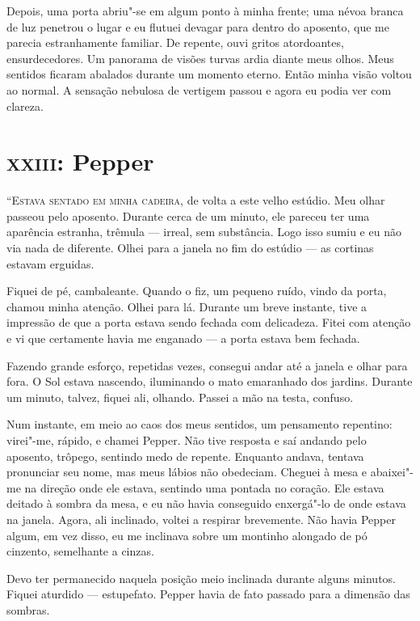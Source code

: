 Depois, uma porta abriu"-se em algum ponto à minha frente; uma névoa branca de luz penetrou o lugar e eu flutuei
devagar para dentro do aposento, que me parecia estranhamente familiar. De repente, ouvi gritos atordoantes,
ensurdecedores. Um panorama de visões turvas ardia diante meus olhos. Meus sentidos ficaram abalados durante um momento
eterno. Então minha visão voltou ao normal. A sensação nebulosa de vertigem passou e agora eu podia ver com clareza.


\clearpage

\chapter{\textsc{xxiii}:  Pepper}

\textsc{“Estava sentado em minha cadeira,} de volta a este velho estúdio. Meu olhar passeou pelo aposento. Durante cerca de um
minuto, ele pareceu ter uma aparência estranha, trêmula --- irreal, sem substância. Logo isso sumiu e eu não via nada de
diferente. Olhei para a janela no fim do estúdio --- as cortinas estavam erguidas.

Fiquei de pé, cambaleante. Quando o fiz, um pequeno ruído, vindo da porta, chamou minha atenção. Olhei para lá. Durante
um breve instante, tive a impressão de que a porta estava sendo fechada com delicadeza. Fitei com atenção e vi que
certamente havia me enganado --- a porta estava bem fechada.

Fazendo grande esforço, repetidas vezes, consegui andar até a janela e olhar para fora. O Sol estava nascendo,
iluminando o mato emaranhado dos jardins. Durante um minuto, talvez, fiquei ali, olhando. Passei a mão na testa,
confuso.

Num instante, em meio ao caos dos meus sentidos, um pensamento repentino: virei"-me, rápido, e chamei Pepper. Não
tive resposta e saí andando pelo aposento, trôpego, sentindo medo de repente. Enquanto andava, tentava pronunciar seu
nome, mas meus lábios não obedeciam. Cheguei à mesa e abaixei"-me na direção onde ele estava, sentindo uma pontada no
coração. Ele estava deitado à sombra da mesa, e eu não havia conseguido enxergá"-lo de onde estava na janela. Agora, ali
inclinado, voltei a respirar brevemente. Não havia Pepper algum, em vez disso, eu me inclinava sobre um montinho
alongado de pó cinzento, semelhante a cinzas.

Devo ter permanecido naquela posição meio inclinada durante alguns minutos. Fiquei aturdido --- estupefato. Pepper havia
de fato passado para a dimensão das sombras.


